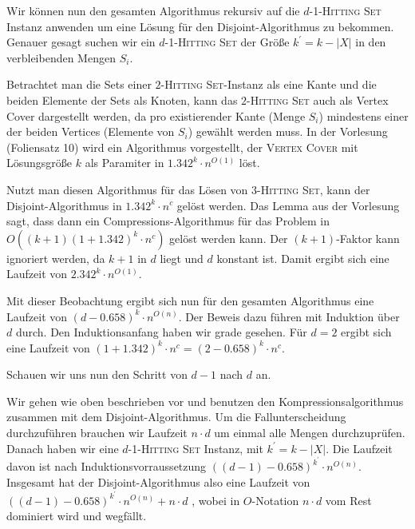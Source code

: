 Wir können nun den gesamten Algorithmus rekursiv auf die $d$-1-\textsc{Hitting Set} Instanz anwenden um eine Lösung für den Disjoint-Algorithmus zu bekommen. Genauer gesagt suchen wir ein $d$-1-\textsc{Hitting Set} der Größe $k^\prime = k - |X|$ in den verbleibenden Mengen $S_i$.

Betrachtet man die Sets einer $2$-\textsc{Hitting Set}-Instanz als eine Kante und die beiden Elemente der Sets als Knoten, kann das $2$-\textsc{Hitting Set} auch als Vertex Cover dargestellt werden, da pro existierender Kante (Menge $S_i$) mindestens einer der beiden Vertices (Elemente von $S_i$) gewählt werden muss. In der Vorlesung (Foliensatz 10) wird ein Algorithmus vorgestellt, der \textsc{Vertex Cover} mit Lösungsgröße $k$ als Paramiter in $1.342^k \cdot n^{O(1)}$ löst. 

Nutzt man diesen Algorithmus für das Lösen von $3$-\textsc{Hitting Set}, kann der Disjoint-Algorithmus in $1.342^k \cdot n^c$ gelöst werden. Das Lemma aus der Vorlesung sagt, dass dann ein Compressions-Algorithmus für das Problem in $O((k+1)(1+1.342)^k \cdot n^c)$ gelöst werden kann. Der $(k+1)$-Faktor kann ignoriert werden, da $k+1$ in $d$ liegt und $d$ konstant ist. Damit ergibt sich eine Laufzeit von $2.342^k \cdot n^{O(1)}$.

Mit dieser Beobachtung ergibt sich nun für den gesamten Algorithmus eine Laufzeit von $(d-0.658)^k \cdot n^{O(n)}$. Der Beweis dazu führen mit Induktion über $d$ durch.
Den Induktionsanfang haben wir grade gesehen. Für $d = 2$ ergibt sich eine Laufzeit von $(1+1.342)^k \cdot n^c = (2-0.658)^k \cdot n^c $.

Schauen wir uns nun den Schritt von $d-1$ nach $d$ an.

Wir gehen wie oben beschrieben vor und benutzen den Kompressionsalgorithmus zusammen mit dem Disjoint-Algorithmus.
Um die Fallunterscheidung durchzuführen brauchen wir Laufzeit $n \cdot d$ um einmal alle Mengen durchzuprüfen. Danach haben wir eine $d$-1-\textsc{Hitting Set} Instanz, mit $k^\prime = k - |X|$. Die Laufzeit davon ist nach Induktionsvorraussetzung $((d-1)-0.658)^{k^\prime} \cdot n^{O(n)}$. 
Insgesamt hat der Disjoint-Algorithmus also eine Laufzeit von $((d-1)-0.658)^{k^\prime} \cdot n^{O(n)} + n \cdot d$ , wobei in $O$-Notation $n \cdot d$ vom Rest dominiert wird und wegfällt.

